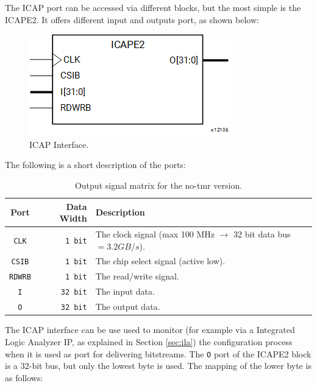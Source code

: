 The ICAP port can be accessed via different blocks, but the most simple is the ICAPE2. It offers different input and outputs port, as shown below:

\begin{figure}[H]
\centering
\includegraphics[width=0.4\linewidth]{images/chapter4/icap.png}
\caption{ICAP Interface.}
\end{figure}

The following is a short description of the ports:

\begin{table}[H]
\centering
\begin{tabular}{ c|r|p{8 cm} }
    \textbf{Port}&\textbf{Data Width}&\textbf{Description}\\
    \hline
    \texttt{CLK}&\texttt{1 bit}&The clock signal (max 100 MHz $\rightarrow$ 32 bit data bus $= 3.2 GB/s$).\\
    \texttt{CSIB}&\texttt{1 bit}&The chip select signal (active low).\\
    \texttt{RDWRB}&\texttt{1 bit}&The read/write signal.\\
    \texttt{I}&\texttt{32 bit}&The input data.\\
    \texttt{O}&\texttt{32 bit}&The output data.\\
\end{tabular}
\caption{Output signal matrix for the no-tmr version.}
\end{table}




The ICAP interface can be use used to monitor (for example via a Integrated Logic Analyzer IP, as explained in Section \ref{sec:ila}) the configuration process when it is used as port for delivering bitstreams. The \texttt{O} port of the ICAPE2 block is a 32-bit bus, but only the lowest byte is used. The mapping of the lower byte is as follows:

